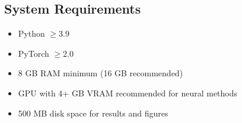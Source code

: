 \documentclass[12pt,a4paper]{article}
\begin{document}
\begin{appendices}
\subsection{System Requirements}

\begin{itemize}
    \item Python $\ge 3.9$
    \item PyTorch $\ge 2.0$
    \item 8 GB RAM minimum (16 GB recommended)
    \item GPU with 4+ GB VRAM recommended for neural methods
    \item 500 MB disk space for results and figures
\end{itemize}

\end{appendices}
\end{document}
